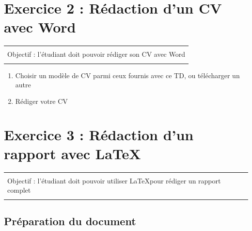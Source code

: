 \documentclass[11pt, a4paper]{article}
\begin{document}
\section*{Exercice 2 : Rédaction d'un CV avec Word}

\vspace{-12pt}
\begin{tabular}{|p{\textwidth}|}
	\hline\\
	Objectif : l'étudiant doit pouvoir rédiger son CV avec Word \\\\
	\hline
\end{tabular}

\begin{enumerate}
	\item Choisir un modèle de CV parmi ceux fournis avec ce TD, ou télécharger un autre 
	\item Rédiger votre CV
\end{enumerate}

\section*{Exercice 3 : Rédaction d'un rapport avec \LaTeX}

\vspace{-12pt}
\begin{tabular}{|p{\textwidth}|}
	\hline\\
	Objectif : l'étudiant doit pouvoir utiliser \LaTeX pour rédiger un rapport complet \\\\
	\hline
\end{tabular}

\subsection*{Préparation du document}
\end{document}
